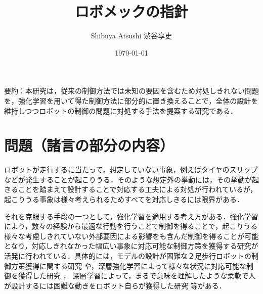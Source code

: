 \documentclass[a4paper,11pt]{jsarticle}
\begin{document}
\title{ロボメックの指針}
\author{Shibuya Atsushi 渋谷享史}
\date{\today}
\maketitle

要約：本研究は，従来の制御方法では未知の要因を含むため対処しきれない問題を，強化学習を用いて得た制御方法に部分的に置き換えることで，全体の設計を維持しつつロボットの制御の問題に対処する手法を提案する研究である．

\section{問題（諸言の部分の内容）}

ロボットが走行するに当たって，想定していない事象，例えばタイヤのスリップなどが発生することが起こりうる．そのような想定外の挙動には，その挙動が起きることを踏まえて設計することで対応する工夫による対処が行われているが，起こりうる事象は様々考えられるためすべてを対応しきるには限界がある．\par
それを克服する手段の一つとして，強化学習を適用する考え方がある．強化学習により，数々の経験から最適な行動を行うことで制御を得ることで，起こりうる様々な考慮しきれていない外部要因による影響をも含んだ制御を得ることが可能となり，対応しきれなかった幅広い事象に対応可能な制御方策を獲得する研究が活発に行われている．具体的には，モデルの設計が困難な２足歩行ロボットの制御方策獲得に関する研究
\cite{Actor-Critic型強化学習を用いたヒューマノイドロボットの動作獲得に関する研究}や，深層強化学習によって様々な状況に対応可能な制御を獲得した研究
\cite{深層強化学習を用いた全方位移動ロボットの行動生成手法の開発}，
深層学習によって，まるで意味を理解したような柔軟で人が設計するには困難な動きをロボット自らが獲得した研究
\cite{視覚センサ付き実ロボットによる箱押し行動の獲得}等がある．\par
\end{document}
